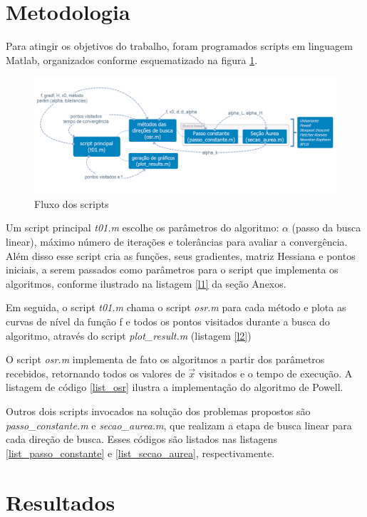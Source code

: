 \documentclass[10pt, a4paper]{article}
\begin{document}
\section{Metodologia}

Para atingir os objetivos do trabalho, foram programados scripts em linguagem Matlab, organizados conforme esquematizado na figura \ref{fig:fluxo}.

\begin{figure}[H]
      \centering
      \includegraphics[width=.9\textwidth]{t01.png}
      \caption{Fluxo dos scripts}
      \label{fig:fluxo}
\end{figure}

Um script principal \textit{t01.m} escolhe os par\^ametros do algoritmo: $\alpha$ (passo da busca linear), m\'aximo n\'umero de itera\c c\~oes e toler\^ancias para avaliar a converg\^encia. Al\'em disso esse script cria as fun\c c\~oes, seus gradientes, matriz Hessiana e pontos iniciais, a serem passados como par\^ametros para o script que implementa os algoritmos, conforme ilustrado na listagem \ref{l1} da se\c c\~ao Anexos.

Em seguida, o script \textit{t01.m} chama o script \textit{osr.m} para cada m\'etodo e plota as curvas de n\'ivel da fun\c c\~ao f e todos os pontos visitados durante a busca do algoritmo, atrav\'es do script \textit{plot\_result.m} (listagem \ref{l2})

O script \textit{osr.m} implementa de fato os algoritmos a partir dos par\^ametros recebidos, retornando todos os valores de $\vec{x}$ visitados e o tempo de execu\c c\~ao. A listagem de c\'odigo \ref{list_osr} ilustra a implementa\c c\~ao do algoritmo de Powell.

Outros dois scripts invocados na solu\c c\~ao dos problemas propostos s\~ao \textit{passo\_constante.m} e \textit{secao\_aurea.m}, que realizam a etapa de busca linear para cada dire\c c\~ao de busca. Esses c\'odigos s\~ao listados nas listagens \ref{list_passo_constante} e \ref{list_secao_aurea}, respectivamente.

\section{Resultados}
\end{document}
